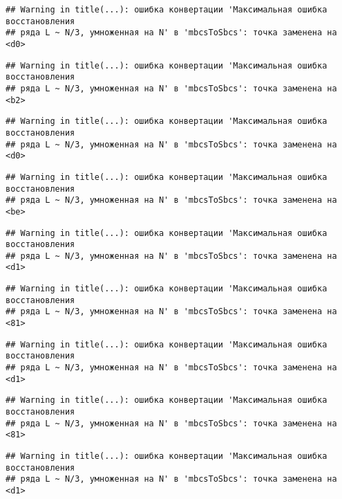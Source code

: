 \documentclass[
]{article}
\begin{document}
\begin{verbatim}
## Warning in title(...): ошибка конвертации 'Максимальная ошибка восстановления
## ряда L ~ N/3, умноженная на N' в 'mbcsToSbcs': точка заменена на <d0>
\end{verbatim}

\begin{verbatim}
## Warning in title(...): ошибка конвертации 'Максимальная ошибка восстановления
## ряда L ~ N/3, умноженная на N' в 'mbcsToSbcs': точка заменена на <b2>
\end{verbatim}

\begin{verbatim}
## Warning in title(...): ошибка конвертации 'Максимальная ошибка восстановления
## ряда L ~ N/3, умноженная на N' в 'mbcsToSbcs': точка заменена на <d0>
\end{verbatim}

\begin{verbatim}
## Warning in title(...): ошибка конвертации 'Максимальная ошибка восстановления
## ряда L ~ N/3, умноженная на N' в 'mbcsToSbcs': точка заменена на <be>
\end{verbatim}

\begin{verbatim}
## Warning in title(...): ошибка конвертации 'Максимальная ошибка восстановления
## ряда L ~ N/3, умноженная на N' в 'mbcsToSbcs': точка заменена на <d1>
\end{verbatim}

\begin{verbatim}
## Warning in title(...): ошибка конвертации 'Максимальная ошибка восстановления
## ряда L ~ N/3, умноженная на N' в 'mbcsToSbcs': точка заменена на <81>
\end{verbatim}

\begin{verbatim}
## Warning in title(...): ошибка конвертации 'Максимальная ошибка восстановления
## ряда L ~ N/3, умноженная на N' в 'mbcsToSbcs': точка заменена на <d1>
\end{verbatim}

\begin{verbatim}
## Warning in title(...): ошибка конвертации 'Максимальная ошибка восстановления
## ряда L ~ N/3, умноженная на N' в 'mbcsToSbcs': точка заменена на <81>
\end{verbatim}

\begin{verbatim}
## Warning in title(...): ошибка конвертации 'Максимальная ошибка восстановления
## ряда L ~ N/3, умноженная на N' в 'mbcsToSbcs': точка заменена на <d1>
\end{verbatim}
\end{document}
